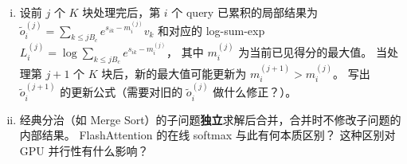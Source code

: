 \documentclass[12pt, a4paper]{ctexart}
\begin{document}
\begin{enumerate}[(a)]
    \begin{enumerate}[i.]
        \item 设前 $j$ 个 $K$ 块处理完后，第 $i$ 个 query 已累积的局部结果为
        $\tilde{o}_i^{(j)} = \sum_{k \leq jB_c} e^{s_{ik} - m_i^{(j)}} v_k$
        和对应的 log-sum-exp $L_i^{(j)} = \log \sum_{k \leq jB_c} e^{s_{ik} - m_i^{(j)}}$，
        其中 $m_i^{(j)}$ 为当前已见得分的最大值。
        当处理第 $j{+}1$ 个 $K$ 块后，新的最大值可能更新为 $m_i^{(j+1)} > m_i^{(j)}$。
        写出 $\tilde{o}_i^{(j+1)}$ 的更新公式（需要对旧的 $\tilde{o}_i^{(j)}$ 做什么修正？）。
        \item 经典分治（如 Merge Sort）的子问题\textbf{独立}求解后合并，合并时不修改子问题的内部结果。
        FlashAttention 的在线 softmax 与此有何本质区别？
        这种区别对 GPU 并行性有什么影响？
    \end{enumerate}
\end{enumerate}
\end{document}
